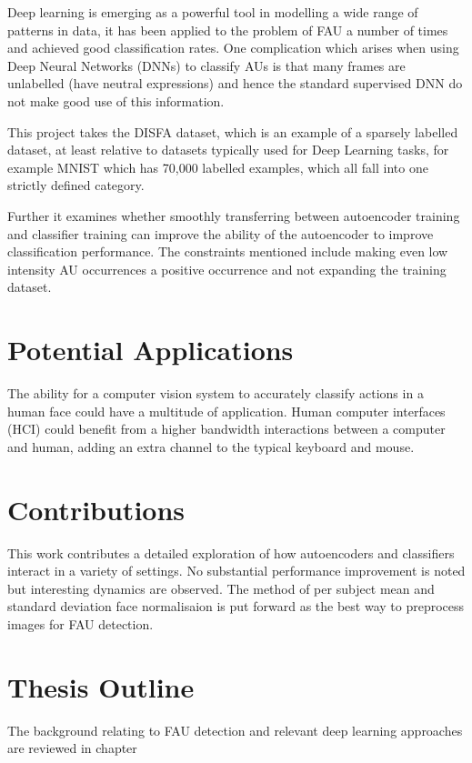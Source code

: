   Deep learning is emerging as a powerful tool in modelling a wide range of patterns
  in data, it has been applied to the problem of FAU a number of times and achieved
  good classification rates. One complication which arises when using Deep Neural
  Networks (DNNs) to classify AUs is that many frames are unlabelled (have neutral expressions)
  and hence the standard supervised DNN do not make good use of this information.

  This project takes the DISFA dataset, which is an example of a sparsely labelled dataset, at least
  relative to datasets typically used for Deep Learning tasks, for example MNIST\cite{mnist} which has
  70,000 labelled examples, which all fall into one strictly defined category.

  Further it examines whether
  smoothly transferring between autoencoder training and classifier training can improve
  the ability of the autoencoder to improve classification performance. The constraints mentioned
  include making even low intensity AU occurrences a positive occurrence and not expanding the
  training dataset.

  \section{Potential Applications}
    The ability for a computer vision system to accurately classify actions in a
    human face could have a multitude of application. Human computer interfaces (HCI)
    could benefit from a higher bandwidth interactions between a computer and human, adding
    an extra channel to the typical keyboard and mouse.

  \section{Contributions}
    This work contributes a detailed exploration of how autoencoders and classifiers
    interact in a variety of settings. No substantial performance improvement is noted
    but interesting dynamics are observed. The method of per subject mean and standard
    deviation face normalisaion is put forward as the best way to preprocess images
    for FAU detection.

  \section{Thesis Outline}
    The background relating to FAU detection and relevant deep learning approaches are
    reviewed in chapter

